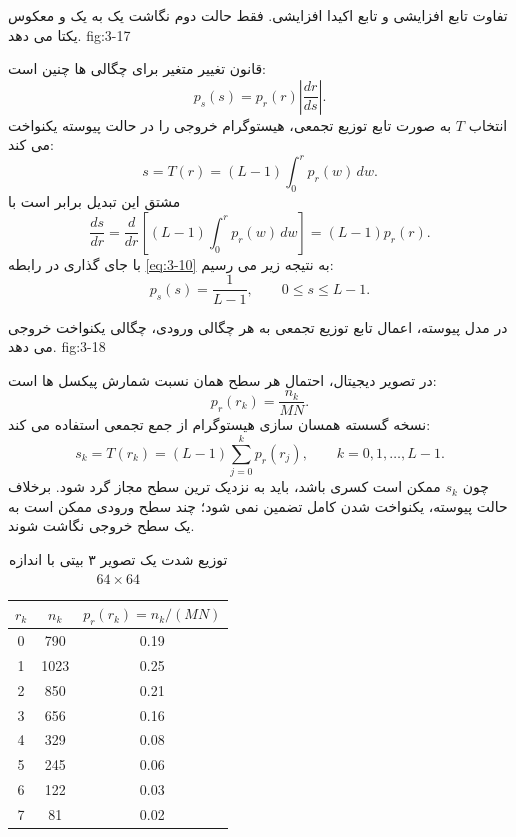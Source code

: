 {تفاوت تابع افزایشی و تابع اکیدا افزایشی. فقط حالت دوم نگاشت یک به یک و
معکوس یکتا می دهد.}
{fig:3-17}

قانون تغییر متغیر برای چگالی ها چنین است:
\begin{equation}
  p_s(s)=p_r(r)\left|\frac{dr}{ds}\right|.
  \tag{3-10}\label{eq:3-10}
\end{equation}
انتخاب \(T\) به صورت تابع توزیع تجمعی، هیستوگرام خروجی را در حالت پیوسته
یکنواخت می کند:
\begin{equation}
  s=T(r)=(L-1)\int_0^r p_r(w)\,dw.
  \tag{3-11}\label{eq:3-11}
\end{equation}
مشتق این تبدیل برابر است با
\begin{equation}
  \frac{ds}{dr}=\frac{d}{dr}\left[(L-1)\int_0^r p_r(w)\,dw\right]
  =(L-1)p_r(r).
  \tag{3-12}\label{eq:3-12}
\end{equation}
با جای گذاری در رابطه \eqref{eq:3-10} به نتیجه زیر می رسیم:
\begin{equation}
  p_s(s)=\frac{1}{L-1},\qquad 0\le s\le L-1.
  \tag{3-13}\label{eq:3-13}
\end{equation}

{در مدل پیوسته، اعمال تابع توزیع تجمعی به هر چگالی ورودی، چگالی یکنواخت
خروجی می دهد.}
{fig:3-18}

در تصویر دیجیتال، احتمال هر سطح همان نسبت شمارش پیکسل ها است:
\begin{equation}
  p_r(r_k)=\frac{n_k}{MN}.
  \tag{3-14}\label{eq:3-14}
\end{equation}
نسخه گسسته همسان سازی هیستوگرام از جمع تجمعی استفاده می کند:
\begin{equation}
  s_k=T(r_k)=(L-1)\sum_{j=0}^{k}p_r(r_j),
  \qquad k=0,1,\ldots,L-1.
  \tag{3-15}\label{eq:3-15}
\end{equation}
چون \(s_k\) ممکن است کسری باشد، باید به نزدیک ترین سطح مجاز گرد شود. برخلاف
حالت پیوسته، یکنواخت شدن کامل تضمین نمی شود؛ چند سطح ورودی ممکن است به یک
سطح خروجی نگاشت شوند.

\begin{table}[H]
\centering
\caption{توزیع شدت یک تصویر ۳ بیتی با اندازه \(64\times64\)}
\label{tab:3-1}
\begin{tabular}{ccc}
\toprule
\(r_k\) & \(n_k\) & \(p_r(r_k)=n_k/(MN)\)\\
\midrule
0 & 790  & 0.19\\
1 & 1023 & 0.25\\
2 & 850  & 0.21\\
3 & 656  & 0.16\\
4 & 329  & 0.08\\
5 & 245  & 0.06\\
6 & 122  & 0.03\\
7 & 81   & 0.02\\
\bottomrule
\end{tabular}
\end{table}

